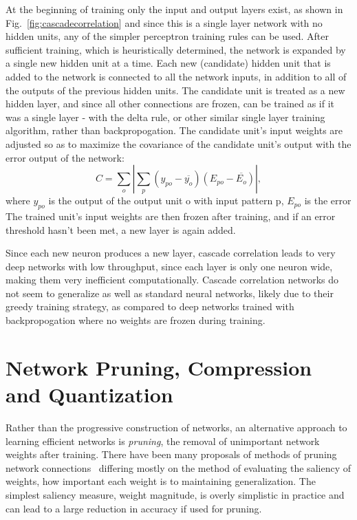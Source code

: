 \documentclass[thesis]{subfiles}
\begin{document}
	At the beginning of training only the input and output layers exist, as shown in Fig.~\ref{fig:cascadecorrelation} and since this is a single layer network with no hidden units, any of the simpler perceptron training rules can be used. After sufficient training, which is heuristically determined, the network is expanded by a single new hidden unit at a time.
	Each new (candidate) hidden unit that is added to the network is connected to all the network inputs, in addition to all of the outputs of the previous hidden units. The candidate unit is treated as a new hidden layer, and since all other connections are frozen, can be trained as if it was a single layer - \ie with the delta rule, or other similar single layer training algorithm, rather than backpropogation. The candidate unit's input weights are adjusted so as to maximize the covariance of the candidate unit's output with the error output of the network:
	\begin{equation}
	    C = \sum_o \left|\sum_p (y_{po} - \overline{y_o})(E_{po} - \overline{E_o})\right|,
	\end{equation}
	where $y_{po}$ is the output of the output unit o with input pattern p, $E_{po}$ is the error The trained unit's input weights are then frozen after training, and if an error threshold hasn't been met, a new layer is again added.
	
	Since each new neuron produces a new layer, cascade correlation leads to very deep networks with low throughput, since each layer is only one neuron wide, making them very inefficient computationally. Cascade correlation networks do not seem to generalize as well as standard neural networks, likely due to their greedy training strategy, as compared to deep networks trained with backpropogation where no weights are frozen during training.
	
	\section{Network Pruning, Compression and Quantization}
       Rather than the progressive construction of networks, an alternative approach to learning efficient networks is \emph{pruning}, the removal of unimportant network weights after training. There have been many proposals of methods of pruning network connections~\citep{lecun1989optimal,sietsma1988neural,Xing2009,journals/corr/HanMD15,ullrich2017soft,} differing mostly on the method of evaluating the saliency of weights, \ie how important each weight is to maintaining generalization. The simplest saliency measure, weight magnitude, is overly simplistic in practice and can lead to a large reduction in accuracy if used for pruning.
       
\end{document}
